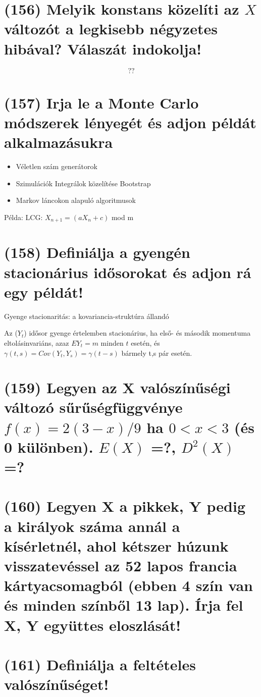 \documentclass[12p]{article}
\begin{document}
\section{(156) Melyik konstans közelíti az $X$ változót a legkisebb négyzetes hibával? Válaszát indokolja!}

$$??$$

\section{(157)  Irja le a Monte Carlo módszerek lényegét és adjon példát alkalmazásukra}

\begin{itemize}
	\item Véletlen szám generátorok
	\item Szimulációk
	\subitem Integrálok közelítése
	\subitem Bootstrap
	\item Markov láncokon alapuló algoritmusok
\end{itemize}

Példa: LCG: $X_{n+1} = (aX_n + c)$ mod m

\section{(158) Definiálja a gyengén stacionárius idősorokat és adjon rá egy példát!}

Gyenge stacionaritás: a kovariancia-struktúra állandó

Az ($Y_t$) idősor gyenge értelemben stacionárius, ha első- és második momentuma eltolásinvariáns, azaz $EY_t = m$ minden $t$ esetén, és $\gamma(t,s) = Cov(Y_t, Y_s) = \gamma(t - s)$ bármely t,s pár esetén.

\section{(159) Legyen az X valószínűségi változó sűrűségfüggvénye $f(x) = 2(3 - x)/9$ ha $0 < x < 3$ (és 0 különben). $E(X)$ =?, $D^2(X)$ =? }

\section{(160) Legyen X a pikkek, Y pedig a királyok száma annál a kísérletnél, ahol kétszer húzunk
visszatevéssel az 52 lapos francia kártyacsomagból (ebben 4 szín van és minden színből 13
lap). Írja fel X, Y együttes eloszlását!}

\section{(161) Definiálja a feltételes valószínűséget!}
\end{document}
